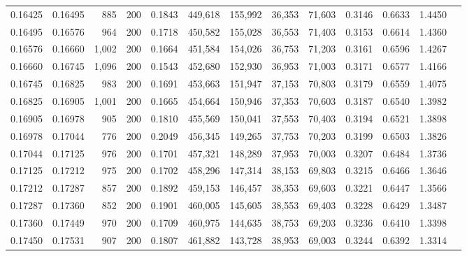 \begin{tabular}{rrrrrrrrrrrrr}
0.16425 & 0.16495 &    885 & 200 &                                     0.1843 & 449,618 & 155,992 &  36,353 &  71,603 & 0.3146 & 0.6633 & 1.4450 \\
0.16495 & 0.16576 &    964 & 200 &                                     0.1718 & 450,582 & 155,028 &  36,553 &  71,403 & 0.3153 & 0.6614 & 1.4360 \\
0.16576 & 0.16660 &  1,002 & 200 &                                     0.1664 & 451,584 & 154,026 &  36,753 &  71,203 & 0.3161 & 0.6596 & 1.4267 \\
0.16660 & 0.16745 &  1,096 & 200 &                                     0.1543 & 452,680 & 152,930 &  36,953 &  71,003 & 0.3171 & 0.6577 & 1.4166 \\
0.16745 & 0.16825 &    983 & 200 &                                     0.1691 & 453,663 & 151,947 &  37,153 &  70,803 & 0.3179 & 0.6559 & 1.4075 \\
0.16825 & 0.16905 &  1,001 & 200 &                                     0.1665 & 454,664 & 150,946 &  37,353 &  70,603 & 0.3187 & 0.6540 & 1.3982 \\
0.16905 & 0.16978 &    905 & 200 &                                     0.1810 & 455,569 & 150,041 &  37,553 &  70,403 & 0.3194 & 0.6521 & 1.3898 \\
0.16978 & 0.17044 &    776 & 200 &                                     0.2049 & 456,345 & 149,265 &  37,753 &  70,203 & 0.3199 & 0.6503 & 1.3826 \\
0.17044 & 0.17125 &    976 & 200 &                                     0.1701 & 457,321 & 148,289 &  37,953 &  70,003 & 0.3207 & 0.6484 & 1.3736 \\
0.17125 & 0.17212 &    975 & 200 &                                     0.1702 & 458,296 & 147,314 &  38,153 &  69,803 & 0.3215 & 0.6466 & 1.3646 \\
0.17212 & 0.17287 &    857 & 200 &                                     0.1892 & 459,153 & 146,457 &  38,353 &  69,603 & 0.3221 & 0.6447 & 1.3566 \\
0.17287 & 0.17360 &    852 & 200 &                                     0.1901 & 460,005 & 145,605 &  38,553 &  69,403 & 0.3228 & 0.6429 & 1.3487 \\
0.17360 & 0.17449 &    970 & 200 &                                     0.1709 & 460,975 & 144,635 &  38,753 &  69,203 & 0.3236 & 0.6410 & 1.3398 \\
0.17450 & 0.17531 &    907 & 200 &                                     0.1807 & 461,882 & 143,728 &  38,953 &  69,003 & 0.3244 & 0.6392 & 1.3314 \\

\end{tabular}

